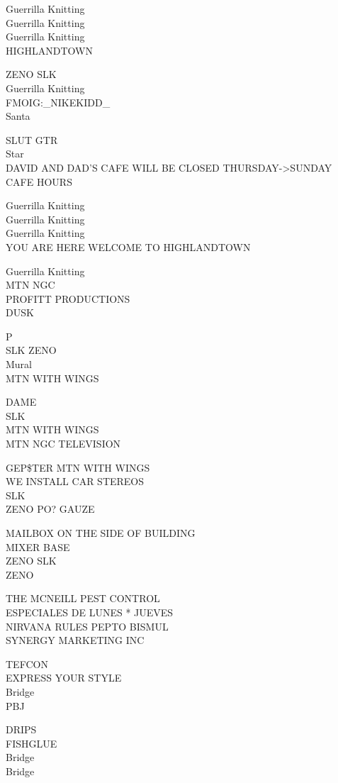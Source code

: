 \documentclass[10pt,letterpaper]{article}
\begin{document}
Guerrilla Knitting\\
Guerrilla Knitting\\
Guerrilla Knitting\\
HIGHLANDTOWN

ZENO SLK\\
Guerrilla Knitting\\
FMOIG:\_NIKEKIDD\_\\
Santa

SLUT GTR\\
Star\\
DAVID AND DAD'S CAFE WILL BE CLOSED THURSDAY{-}>SUNDAY\\
CAFE HOURS

Guerrilla Knitting\\
Guerrilla Knitting\\
Guerrilla Knitting\\
YOU ARE HERE WELCOME TO HIGHLANDTOWN

Guerrilla Knitting\\
MTN NGC\\
PROFITT PRODUCTIONS\\
DUSK

P\\
SLK ZENO\\
Mural\\
MTN WITH WINGS

DAME\\
SLK\\
MTN WITH WINGS\\
MTN NGC TELEVISION

GEP\$TER MTN WITH WINGS\\
WE INSTALL CAR STEREOS\\
SLK\\
ZENO PO? GAUZE

MAILBOX ON THE SIDE OF BUILDING\\
MIXER BASE\\
ZENO SLK\\
ZENO

THE MCNEILL PEST CONTROL\\
ESPECIALES DE LUNES * JUEVES\\
NIRVANA RULES PEPTO BISMUL\\
SYNERGY MARKETING INC

TEFCON\\
EXPRESS YOUR STYLE\\
Bridge\\
PBJ

DRIPS\\
FISHGLUE\\
Bridge\\
Bridge
\end{document}
